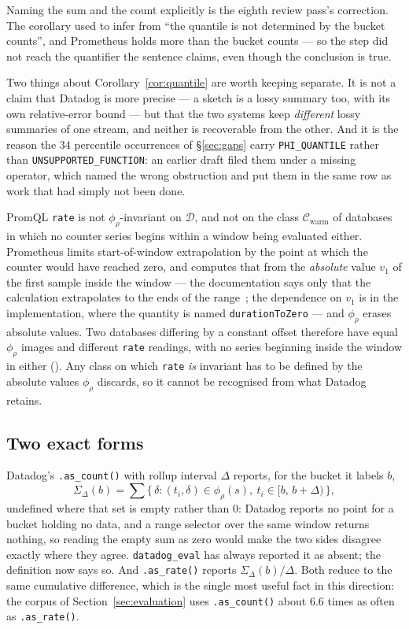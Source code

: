 \noindent
Naming the sum and the count explicitly is the eighth review pass's correction. The
corollary used to infer from ``the quantile is not determined by the bucket counts'', and
Prometheus holds more than the bucket counts --- so the step did not reach the quantifier
the sentence claims, even though the conclusion is true.

\noindent
Two things about Corollary~\ref{cor:quantile} are worth keeping separate. It is not a
claim that Datadog is more precise --- a sketch is a lossy summary too, with its own
relative-error bound --- but that the two systems keep \emph{different} lossy summaries
of one stream, and neither is recoverable from the other. And it is the reason the
$34$ percentile occurrences of \S\ref{sec:gaps} carry \texttt{PHI\_QUANTILE} rather
than \texttt{UNSUPPORTED\_FUNCTION}: an earlier draft filed them under a missing
operator, which named the wrong obstruction and put them in the same row as work that
had simply not been done.

\begin{corollary}\label{cor:rate}
PromQL \texttt{rate} is not $\phi_\rho$-invariant on $\mathcal{D}$, and not on the class
$\mathcal{C}_{\mathrm{warm}}$ of databases in which no counter series begins within a
window being evaluated either. Prometheus limits start-of-window extrapolation by the
point at which the counter would have reached zero, and computes that from the
\emph{absolute} value $v_1$ of the first sample inside the window --- the documentation
says only that the calculation extrapolates to the ends of the range~\citep{promql}; the
dependence on $v_1$ is in the implementation, where the quantity is named
\texttt{durationToZero} --- and $\phi_\rho$ erases absolute values. Two databases
differing by a constant offset therefore have equal $\phi_\rho$ images and different
\texttt{rate} readings, with no series beginning inside the window in either
(). Any class on which \texttt{rate} \emph{is} invariant has to be
defined by the absolute values $\phi_\rho$ discards, so it cannot be recognised from
what Datadog retains.
\end{corollary}
\iffull\fi
\subsection{Two exact forms}

Datadog's \texttt{.as\_count()} with rollup interval $\Delta$ reports, for the bucket it
labels $b$,
\[
\Sigma_\Delta(b)=\sum\{\,\delta : (t_i,\delta)\in\phi_\rho(s),\ t_i\in[b,\,b+\Delta)\,\},
\]
undefined where that set is empty rather than $0$: Datadog reports no point for a bucket
holding no data, and a range selector over the same window returns nothing, so reading
the empty sum as zero would make the two sides disagree exactly where they agree.
\texttt{datadog\_eval} has always reported it as absent; the definition now says so. And
\texttt{.as\_rate()} reports $\Sigma_\Delta(b)/\Delta$. Both reduce to the same
cumulative difference, which is the single most useful fact in this direction: the
corpus of Section~\ref{sec:evaluation} uses \texttt{.as\_count()} about $6.6$ times as
often as \texttt{.as\_rate()}.

